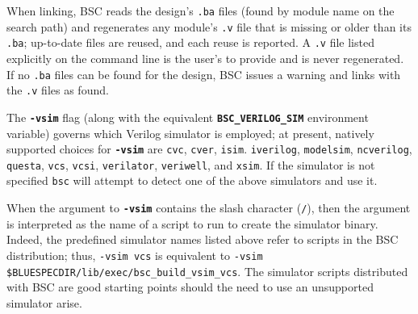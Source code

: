 \documentclass{article}
\newcommand{\te}[1]{\texttt{#1}}
\begin{document}
When linking, BSC reads the design's \te{.ba} files (found by module
name on the search path) and regenerates any module's \te{.v} file
that is missing or older than its \te{.ba}; up-to-date files are
reused, and each reuse is reported.  A \te{.v} file listed explicitly
on the command line is the user's to provide and is never regenerated.
If no \te{.ba} files can be found for the design, BSC issues a warning
and links with the \te{.v} files as found.



\index{-vsim@\te{-vsim} (compiler flag)}

\label{sec:using-verilog}
The \textbf{\texttt{-vsim}} flag
(along with the equivalent
\textbf{\texttt{BSC\_VERILOG\_SIM}} environment variable) governs which Verilog
simulator is employed; at present, natively supported choices for
\textbf{\texttt{-vsim}} are
\texttt{cvc},
\texttt{cver},
\texttt{isim}.
\texttt{iverilog},
\texttt{modelsim},
\texttt{ncverilog},
\texttt{questa},
\texttt{vcs},
\texttt{vcsi},
\texttt{verilator},
\texttt{veriwell},
and \texttt{xsim}.
If the simulator is not specified \texttt{bsc} will attempt to detect one
of the above simulators and use it.

When the argument to \textbf{\texttt{-vsim}} contains the slash character
(\texttt{/}), then the argument is interpreted as the name of a script to run
to create the simulator binary.  Indeed, the predefined simulator names listed
above refer to scripts in the BSC distribution; thus,
\texttt{-vsim vcs} is equivalent to \texttt{-vsim
\$BLUESPECDIR/lib/exec/bsc\_build\_vsim\_vcs}.  The simulator scripts distributed
with BSC are good starting points should the need to use an unsupported
simulator arise.
\end{document}
